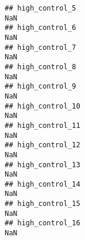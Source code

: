 \documentclass[
]{article}
\begin{document}
\begin{verbatim}
## high_control_5                                                                                                                                                                                                                NaN
## high_control_6                                                                                                                                                                                                                NaN
## high_control_7                                                                                                                                                                                                                NaN
## high_control_8                                                                                                                                                                                                                NaN
## high_control_9                                                                                                                                                                                                                NaN
## high_control_10                                                                                                                                                                                                               NaN
## high_control_11                                                                                                                                                                                                               NaN
## high_control_12                                                                                                                                                                                                               NaN
## high_control_13                                                                                                                                                                                                               NaN
## high_control_14                                                                                                                                                                                                               NaN
## high_control_15                                                                                                                                                                                                               NaN
## high_control_16                                                                                                                                                                                                               NaN

\end{verbatim}
\end{document}

